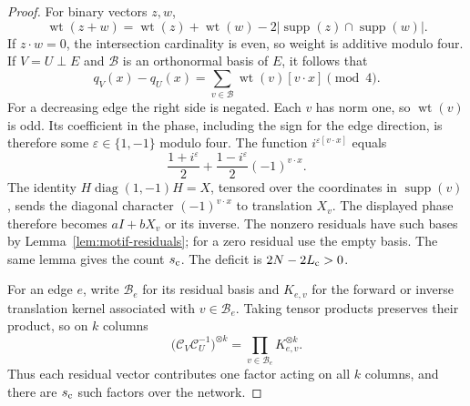 \documentclass[11pt]{article}
\theoremstyle{definition}
\begin{document}
\begin{proof}
For binary vectors $z,w$,
\[
 \operatorname{wt}(z+w)
 =\operatorname{wt}(z)+\operatorname{wt}(w)
       -2|\operatorname{supp}(z)\cap\operatorname{supp}(w)|.
\]
If $z\cdot w=0$, the intersection cardinality is even, so weight is
additive modulo four.  If $V=U\mathbin{\perp}E$ and $\mathcal B$
is an orthonormal basis of $E$, it follows that
\[
 q_V(x)-q_U(x)=\sum_{v\in\mathcal B}
                 \operatorname{wt}(v)[v\cdot x]\pmod4.
\]
For a decreasing edge the right side is negated.
Each $v$ has norm one, so $\operatorname{wt}(v)$ is odd.  Its
coefficient in the phase, including the sign for the edge direction,
is therefore some $\varepsilon\in\{1,-1\}$ modulo four.  The function
$i^{\varepsilon[v\cdot x]}$ equals
\[
 \frac{1+i^\varepsilon}{2}
 +\frac{1-i^\varepsilon}{2}(-1)^{v\cdot x}.
\]
The identity $H\operatorname{diag}(1,-1)H=X$, tensored over the
coordinates in $\operatorname{supp}(v)$, sends the diagonal character
$(-1)^{v\cdot x}$ to translation $X_v$.  The displayed phase therefore
becomes $aI+bX_v$ or its inverse.  The nonzero residuals have such
bases by Lemma~\ref{lem:motif-residuals}; for a zero residual use the
empty basis.  The same lemma gives the count $s_{\rm c}$.
The deficit is $2N-2L_{\rm c}>0$.

For an edge $e$, write $\mathcal B_e$ for its residual basis and
$K_{e,v}$ for the forward or inverse translation kernel associated
with $v\in\mathcal B_e$.  Taking tensor products preserves their
product, so on $k$ columns
\[
 \bigl(\mathcal C_V\mathcal C_U^{-1}\bigr)^{\otimes k}
 =\prod_{v\in\mathcal B_e}K_{e,v}^{\otimes k}.
\]
Thus each residual vector contributes one factor acting on all $k$
columns, and there are $s_{\rm c}$ such factors over the network.


\end{proof}
\end{document}
